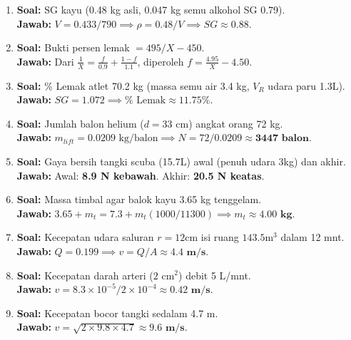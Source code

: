 \documentclass{article}
\begin{document}
\begin{enumerate}[label=\textbf{\arabic*.}]
    \item \textbf{Soal:} SG kayu (0.48 kg asli, 0.047 kg semu alkohol SG 0.79). \\
    \textbf{Jawab:} $V = 0.433/790 \implies \rho = 0.48/V \implies SG \approx \mathbf{0.88}$.

    \item \textbf{Soal:} Bukti persen lemak $= 495/X - 450$. \\
    \textbf{Jawab:} Dari $\frac{1}{X} = \frac{f}{0.9} + \frac{1-f}{1.1}$, diperoleh $f = \frac{4.95}{X} - 4.50$.

    \item \textbf{Soal:} \% Lemak atlet 70.2 kg (massa semu air 3.4 kg, $V_R$ udara paru 1.3L). \\
    \textbf{Jawab:} $SG = 1.072 \implies \% \text{ Lemak} \approx \mathbf{11.75\%}$.

    \item \textbf{Soal:} Jumlah balon helium ($d = 33 \text{ cm}$) angkat orang 72 kg. \\
    \textbf{Jawab:} $m_{lift} = 0.0209 \text{ kg/balon} \implies N = 72/0.0209 \approx \mathbf{3447 \text{ balon}}$.

    \item \textbf{Soal:} Gaya bersih tangki scuba (15.7L) awal (penuh udara 3kg) dan akhir. \\
    \textbf{Jawab:} Awal: \textbf{8.9 N kebawah}. Akhir: \textbf{20.5 N keatas}.

    \item \textbf{Soal:} Massa timbal agar balok kayu 3.65 kg tenggelam. \\
    \textbf{Jawab:} $3.65 + m_t = 7.3 + m_t(1000/11300) \implies m_t \approx \mathbf{4.00 \text{ kg}}$.

    \item \textbf{Soal:} Kecepatan udara saluran $r=12\text{cm}$ isi ruang $143.5\text{m}^3$ dalam 12 mnt. \\
    \textbf{Jawab:} $Q = 0.199 \implies v = Q/A \approx \mathbf{4.4 \text{ m/s}}$.

    \item \textbf{Soal:} Kecepatan darah arteri ($2 \text{ cm}^2$) debit 5 L/mnt. \\
    \textbf{Jawab:} $v = 8.3 \times 10^{-5} / 2 \times 10^{-4} \approx \mathbf{0.42 \text{ m/s}}$.

    \item \textbf{Soal:} Kecepatan bocor tangki sedalam 4.7 m. \\
    \textbf{Jawab:} $v = \sqrt{2 \times 9.8 \times 4.7} \approx \mathbf{9.6 \text{ m/s}}$.


\end{enumerate}
\end{document}
